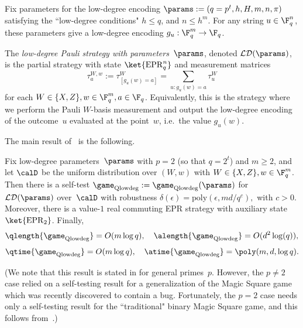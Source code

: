 \begin{definition}
Fix parameters for the low-degree encoding $\params := (q = p^t, h, H, m, n, \pi)$
satisfying the ``low-degree conditions"
$h \leq q$, and $n \leq h^m$.
For any string $u \in \F_q^n$,
these parameters give a low-degree encoding $g_u:\F_q^m \rightarrow \F_q$.

The \emph{low-degree Pauli strategy with parameters~$\params$},
denoted $\mathcal{LD}(\params)$, is the partial strategy
with state $\ket{\mathrm{EPR}^n_q}$ and measurement matrices
\begin{equation*}
\tau^{W, w}_a :=
\tau^{W}_{[g_u(w) = a]} =
\sum_{u : g_u(w) = a} \tau^W_u
\end{equation*}
for each $W \in \{X, Z\}, w \in \F_q^m, a \in \F_q$.
Equivalently, this is the strategy where we perform the Pauli $W$-basis measurement
and output the low-degree encoding of the outcome~$u$ evaluated at the point~$w$, i.e.\ the value $g_u(w)$.
\end{definition}

The main result of~\cite{NV18a} is the following.

\begin{theorem}[{\cite[Theorem 3.2]{NV18a}}]\label{thm:anand-thomas-low-degree}
Fix low-degree parameters~$\params$ with $p = 2$ (so that $q = 2^t$) and $m \geq 2$, 
and let $\calD$ be the uniform distribution over $(W, w)$ with $W \in \{X, Z\}, w \in \F_q^m$.
Then there is a self-test $\game_{\mathrm{Qlowdeg}} := \game_{\mathrm{Qlowdeg}}(\params)$
for $\mathcal{LD}(\params)$ over~$\calD$
with robustness
$
\delta(\epsilon) = \mathrm{poly}(\epsilon,md/q^c),
$
with $c > 0$.
Moreover, there is a value-$1$ real commuting EPR strategy with auxiliary state $\ket{\mathrm{EPR}_2}$.
Finally,
\begin{equation*}
\qlength{\game_{\mathrm{Qlowdeg}}} = O(m \log q),
\quad
\alength{\game_{\mathrm{Qlowdeg}}} = O(d^2 \log (q)),
\end{equation*}
\begin{equation*}
\qtime{\game_{\mathrm{Qlowdeg}}} = O(m \log q),
\quad
\atime{\game_{\mathrm{Qlowdeg}}} = \poly(m, d, \log q).
\end{equation*}
\end{theorem}

(We note that this result is stated in \cite{NV18a} for general primes~$p$.
However, the $p \neq 2$ case relied on a self-testing result for a generalization of the Magic Square game
which was recently discovered to contain a bug. 
Fortunately, the $p=2$ case needs only a self-testing result for the
``traditional" binary Magic Square game, and this follows
from~\cite{WBMS16}.)

